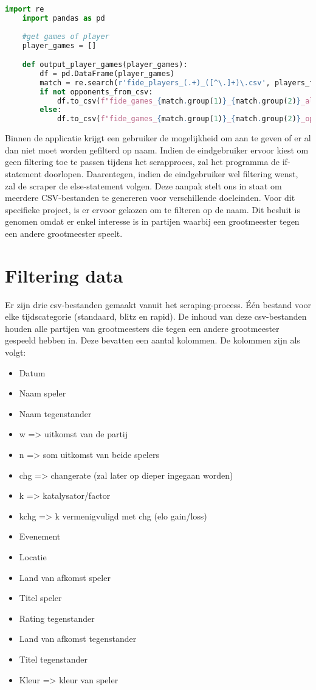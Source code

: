 \begin{lstlisting}[language=Python]
    import re
    import pandas as pd
    
    #get games of player
    player_games = []

    def output_player_games(player_games):
        df = pd.DataFrame(player_games)
        match = re.search(r'fide_players_(.+)_([^\.]+)\.csv', players_file_name)
        if not opponents_from_csv:
            df.to_csv(f"fide_games_{match.group(1)}_{match.group(2)}_all.csv", index=False)
        else:
            df.to_csv(f"fide_games_{match.group(1)}_{match.group(2)}_oppfromcsv.csv", index=False)
\end{lstlisting}

Binnen de applicatie krijgt een gebruiker de mogelijkheid om aan te geven of er al dan niet moet worden gefilterd op naam. Indien de eindgebruiker ervoor kiest om geen filtering toe te passen tijdens het scrapproces, zal het programma de if-statement doorlopen. Daarentegen, indien de eindgebruiker wel filtering wenst, zal de scraper de else-statement volgen. Deze aanpak stelt ons in staat om meerdere CSV-bestanden te genereren voor verschillende doeleinden. Voor dit specifieke project, is er ervoor gekozen om te filteren op de naam. Dit besluit is genomen omdat er enkel interesse is in partijen waarbij een grootmeester tegen een andere grootmeester speelt.

\section{Filtering data}

Er zijn drie csv-bestanden gemaakt vanuit het scraping-process. Één bestand voor elke tijdscategorie (standaard, blitz en rapid). De inhoud van deze csv-bestanden houden alle partijen van grootmeesters die tegen een andere grootmeester gespeeld hebben in. Deze bevatten een aantal kolommen. De kolommen zijn als volgt:

\begin{itemize}
    \item Datum
    \item Naam speler
    \item Naam tegenstander
    \item w => uitkomst van de partij
    \item n => som uitkomst van beide spelers
    \item chg => changerate (zal later op dieper ingegaan worden)
    \item k => katalysator/factor
    \item kchg => k vermenigvuligd met chg (elo gain/loss)
    \item Evenement
    \item Locatie
    \item Land van afkomst speler
    \item Titel speler
    \item Rating tegenstander
    \item Land van afkomst tegenstander 
    \item Titel tegenstander
    \item Kleur => kleur van speler
\end{itemize}

